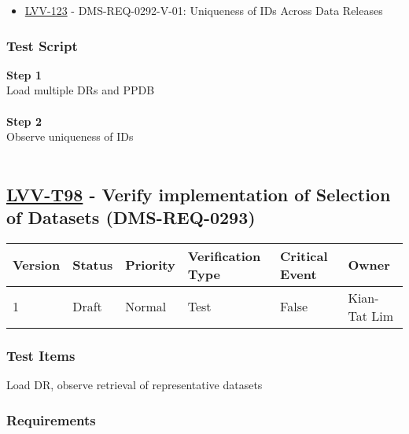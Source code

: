 \begin{itemize}
\tightlist
\item
  \href{https://jira.lsstcorp.org/browse/LVV-123}{LVV-123} -
  DMS-REQ-0292-V-01: Uniqueness of IDs Across Data Releases
\end{itemize}

\hypertarget{test-script-74}{%
\subsubsection{Test Script}\label{test-script-74}}

\textbf{Step 1}\\
Load multiple DRs and PPDB\\
~\\
\textbf{Step 2}\\
Observe uniqueness of IDs\\
~\\

\hypertarget{lvv-t98---verify-implementation-of-selection-of-datasets-dms-req-0293}{%
\subsection{\texorpdfstring{\href{https://jira.lsstcorp.org/secure/Tests.jspa\#/testCase/LVV-T98}{LVV-T98}
- Verify implementation of Selection of Datasets
(DMS-REQ-0293)}{LVV-T98 - Verify implementation of Selection of Datasets (DMS-REQ-0293)}}\label{lvv-t98---verify-implementation-of-selection-of-datasets-dms-req-0293}}

\begin{longtable}[]{@{}llllll@{}}
\toprule
Version & Status & Priority & Verification Type & Critical Event &
Owner\tabularnewline
\midrule
\endhead
1 & Draft & Normal & Test & False & Kian-Tat Lim\tabularnewline
\bottomrule
\end{longtable}

\hypertarget{test-items-74}{%
\subsubsection{Test Items}\label{test-items-74}}

Load DR, observe retrieval of representative datasets

\hypertarget{requirements-75}{%
\subsubsection{Requirements}\label{requirements-75}}


